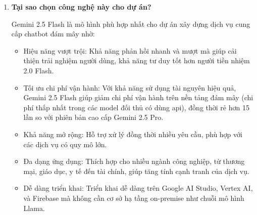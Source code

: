 \begin{enumerate}
	trong đó:
	\begin{itemize}
		\item Global Average (Hiệu suất tổng thể): Phản ánh hiệu suất tổng thể của model trong mọi khía cạnh. Điều này quan trọng vì chatbot chăm sóc khách hàng cần xử lý đa dạng yêu cầu, từ ngôn ngữ đến dữ liệu phân tích, dù không nhất thiết phải xuất sắc ở tất cả.
		
		\item Reasoning Average (Khả năng suy luận): Khả năng suy luận rất quan trọng vì chatbot cần hiểu ngữ cảnh, giải quyết vấn đề của khách hàng và đưa ra câu trả lời hợp lý. Ví dụ, khi khách hàng trình bày một vấn đề, chatbot phải phân tích đúng và đề xuất giải pháp.
		
		\item Language Average (Khả năng xử lý ngôn ngữ): Đây là yếu tố cốt lõi cho chatbot chăm sóc khách hàng, vì chatbot cần giao tiếp tự nhiên, hiểu câu hỏi của khách hàng, và trả lời một cách rõ ràng và chính xác.
		
		\item IF Average (Instruction Following - Khả năng làm theo hướng dẫn): Đảm bảo rằng chatbot có thể hiểu và tuân theo các yêu cầu cụ thể từ khách hàng, chẳng hạn như "Liệt kê danh sách điểm đến" hoặc "Cập nhật thông tin liên lạc".
	\end{itemize}
	
	Với Instruction Following cao nhất (79.02), Gemini 2.5 Flash Preview đảm bảo chatbot có thể hiểu và đáp ứng chính xác yêu cầu của khách hàng, yếu tố quan trọng nhất cho chăm sóc khách hàng. Reasoning: Đạt mức cao (73.47), đủ để xử lý các tình huống cần suy luận.
	Language: Đứng đầu, giúp chatbot giao tiếp tự nhiên, hiểu ý người dùng và bám sát yêu cầu.
	\item \textbf{Tại sao chọn công nghệ này cho dự án?}
	
	Gemini 2.5 Flash là mô hình phù hợp nhất cho dự án xây dựng dịch vụ cung cấp chatbot đám mây nhờ:
	\begin{itemize}
		\item Hiệu năng vượt trội: Khả năng phản hồi nhanh và mượt mà giúp cải thiện trải nghiệm người dùng, khả năng tư duy tốt hơn người tiền nhiệm 2.0 Flash.
		\item Tối ưu chi phí vận hành: Với khả năng sử dụng tài nguyên hiệu quả, Gemini 2.5 Flash giúp giảm chi phí vận hành trên nền tảng đám mây (chi phí thấp nhất trong các model đối thủ có dùng api), đồng thời rẻ hơn 15 lần so với phiên bản cao cấp Gemini 2.5 Pro.
		\item Khả năng mở rộng: Hỗ trợ xử lý đồng thời nhiều yêu cầu, phù hợp với các dịch vụ có quy mô lớn. 
		\item Đa dạng ứng dụng: Thích hợp cho nhiều ngành công nghiệp, từ thương mại, giáo dục, y tế đến tài chính, giúp tăng tính cạnh tranh của dịch vụ.
		\item Dễ dàng triển khai: Triển khai dễ dàng trên Google AI Studio, Vertex AI, và Firebase mà không cần cơ sở hạ tầng on-premise như chuỗi mô hình Llama.
	\end{itemize}
	
\end{enumerate}
\renewcommand{\labelenumi}{\arabic{enumi}.}


